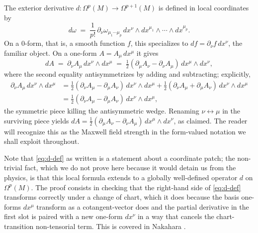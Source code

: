 The exterior derivative $d : \Omega^p(M) \to \Omega^{p+1}(M)$ is defined in local coordinates by
\begin{equation}\label{eq:d-def}
d\omega \;=\; \frac{1}{p!}\,\partial_\nu \omega_{\mu_1\cdots\mu_p}\,dx^\nu \wedge dx^{\mu_1}\wedge\cdots\wedge dx^{\mu_p}.
\end{equation}
On a 0-form, that is, a smooth function $f$, this specializes to $df = \partial_\nu f\, dx^\nu$, the familiar object. On a one-form $A = A_\mu\,dx^\mu$ it gives
\begin{equation*}
dA \;=\; \partial_\nu A_\mu\, dx^\nu \wedge dx^\mu \;=\; \tfrac{1}{2}(\partial_\mu A_\nu - \partial_\nu A_\mu)\,dx^\mu \wedge dx^\nu,
\end{equation*}
where the second equality antisymmetrizes by adding and subtracting; explicitly,
\begin{align*}
\partial_\nu A_\mu\, dx^\nu\wedge dx^\mu
&= \tfrac{1}{2}(\partial_\nu A_\mu - \partial_\mu A_\nu)\,dx^\nu\wedge dx^\mu + \tfrac{1}{2}(\partial_\nu A_\mu + \partial_\mu A_\nu)\,dx^\nu\wedge dx^\mu \\
&= \tfrac{1}{2}(\partial_\nu A_\mu - \partial_\mu A_\nu)\,dx^\nu\wedge dx^\mu,
\end{align*}
the symmetric piece killing the antisymmetric wedge. Renaming $\nu\leftrightarrow\mu$ in the surviving piece yields $dA = \tfrac{1}{2}(\partial_\mu A_\nu - \partial_\nu A_\mu)\,dx^\mu\wedge dx^\nu$, as claimed. The reader will recognize this as the Maxwell field strength in the form-valued notation we shall exploit throughout.

\medskip

\noindent Note that \eqref{eq:d-def} as written is a statement about a coordinate patch; the non-trivial fact, which we do not prove here because it would detain us from the physics, is that this local formula extends to a globally well-defined operator $d$ on $\Omega^p(M)$. The proof consists in checking that the right-hand side of \eqref{eq:d-def} transforms correctly under a change of chart, which it does because the basis one-forms $dx^\mu$ transform as a cotangent-vector does and the partial derivative in the first slot is paired with a new one-form $dx^\nu$ in a way that cancels the chart-transition non-tensorial term. This is covered in Nakahara \cite{Nakahara2003GTP}.

